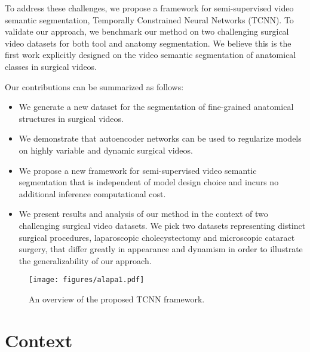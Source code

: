 \documentclass[twoside, print]{ieeecolor_arxiv}
\begin{document}
To address these challenges, we propose a framework for semi-supervised video semantic segmentation, Temporally Constrained Neural Networks (TCNN). To validate our approach, we benchmark our method on two challenging surgical video datasets for both tool and anatomy segmentation. We believe this is the first work explicitly designed on the video semantic segmentation of anatomical classes in surgical videos.
  
Our contributions can be summarized as follows: 
\begin{itemize}
  \item We generate a new dataset for the segmentation of fine-grained anatomical structures in surgical videos.
  \item We demonstrate that autoencoder networks can be used to regularize models on highly variable and dynamic surgical videos.
  \item We propose a new framework for semi-supervised video semantic segmentation that is independent of model design choice and incurs no additional inference computational cost.
  \item We present results and analysis of our method in the context of two challenging surgical video datasets. We pick two datasets representing distinct surgical procedures, laparoscopic cholecystectomy and microscopic cataract surgery, that differ greatly in appearance and dynamism in order to illustrate the generalizability of our approach.
\end{itemize}


\begin{figure*}[!t]
\centerline{\texttt{[image: figures/alapa1.pdf]}}
\caption{An overview of the proposed TCNN framework.}
\label{fig1}
\end{figure*}  
  
\section{Context}
\end{document}
